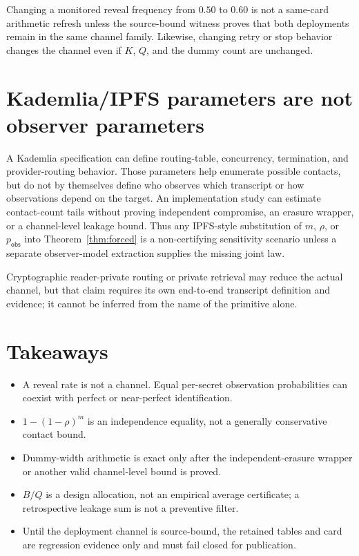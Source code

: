 \documentclass[11pt]{article}
\begin{document}
Changing a monitored reveal frequency from \(0.50\) to \(0.60\) is not a same-card arithmetic refresh unless the source-bound witness proves that both deployments remain in the same channel family. Likewise, changing retry or stop behavior changes the channel even if \(K\), \(Q\), and the dummy count are unchanged.

\section{Kademlia/IPFS parameters are not observer parameters}\label{sec:ipfs}
A Kademlia specification can define routing-table, concurrency, termination, and provider-routing behavior. Those parameters help enumerate possible contacts, but do not by themselves define who observes which transcript or how observations depend on the target. An implementation study can estimate contact-count tails without proving independent compromise, an erasure wrapper, or a channel-level leakage bound. Thus any IPFS-style substitution of \(m\), \(\rho\), or \(p_{\mathsf{obs}}\) into Theorem~\ref{thm:forced} is a non-certifying sensitivity scenario unless a separate observer-model extraction supplies the missing joint law.\cite{ipfs_kad_spec,cortes2024kadlimits}

Cryptographic reader-private routing or private retrieval may reduce the actual channel, but that claim requires its own end-to-end transcript definition and evidence; it cannot be inferred from the name of the primitive alone.\cite{mazmudar2025peer2pir}

\section{Takeaways}
\begin{itemize}[leftmargin=*]
\item A reveal rate is not a channel. Equal per-secret observation probabilities can coexist with perfect or near-perfect identification.
\item \(1-(1-\rho)^m\) is an independence equality, not a generally conservative contact bound.
\item Dummy-width arithmetic is exact only after the independent-erasure wrapper or another valid channel-level bound is proved.
\item \(B/Q\) is a design allocation, not an empirical average certificate; a retrospective leakage sum is not a preventive filter.
\item Until the deployment channel is source-bound, the retained tables and card are regression evidence only and must fail closed for publication.
\end{itemize}
\end{document}
